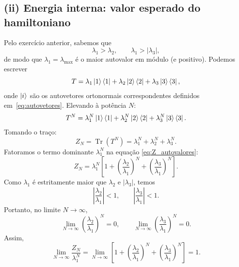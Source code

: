 \documentclass[11pt,a4paper]{article}
\begin{document}
\subsection*{(ii) Energia interna: valor esperado do hamiltoniano}
%
Pelo exercício anterior, sabemos que
%
\begin{equation}
    \lambda_1 > \lambda_2, \qquad \lambda_1 > |\lambda_3|,
\end{equation}
%
de modo que \(\lambda_1 = \lambda_{\max}\) é o maior autovalor em módulo (e positivo). Podemos escrever
%
\begin{equation}
    T = \lambda_1 \ket{1}\bra{1} + \lambda_2 \ket{2}\bra{2} + \lambda_3 \ket{3}\bra{3},
\end{equation}
%
onde \(\ket{i}\) são os autovetores ortonormais correspondentes definidos em~\eqref{eq:autovetores}. Elevando à potência \(N\):
%
\begin{equation}
    T^N = \lambda_1^N \ket{1}\bra{1} + \lambda_2^N \ket{2}\bra{2} + \lambda_3^N \ket{3}\bra{3}.
\end{equation}
%
Tomando o traço:
%
\begin{equation}
    Z_N = \operatorname{Tr}(T^N) = \lambda_1^N + \lambda_2^N + \lambda_3^N.
    \label{eq:Z_autovalores}
\end{equation}
%
Fatoramos o termo dominante \(\lambda_1^N\) na equação \eqref{eq:Z_autovalores}:
%
\begin{equation}
    Z_N = \lambda_1^N \left[ 1 + \left( \frac{\lambda_2}{\lambda_1} \right)^N + \left( \frac{\lambda_3}{\lambda_1} \right)^N \right].
    \label{eq:Z_fatorado}
\end{equation}
%
Como \(\lambda_1\) é estritamente maior que \(\lambda_2\) e \(|\lambda_3|\), temos
%
\begin{equation}
    \left| \frac{\lambda_2}{\lambda_1} \right| < 1,
    \qquad
    \left| \frac{\lambda_3}{\lambda_1} \right| < 1.
\end{equation}
%
Portanto, no limite \(N \to \infty\),
%
\begin{equation}
    \lim_{N \to \infty} \left( \frac{\lambda_2}{\lambda_1} \right)^N = 0,
    \qquad
    \lim_{N \to \infty} \left( \frac{\lambda_3}{\lambda_1} \right)^N = 0.
\end{equation}
%
Assim,
%
\begin{equation}
    \lim_{N \to \infty} \frac{Z_N}{\lambda_1^N}
    = \lim_{N \to \infty} \left[ 1 + \left( \frac{\lambda_2}{\lambda_1} \right)^N + \left( \frac{\lambda_3}{\lambda_1} \right)^N \right]
    = 1.
\end{equation}
\end{document}

